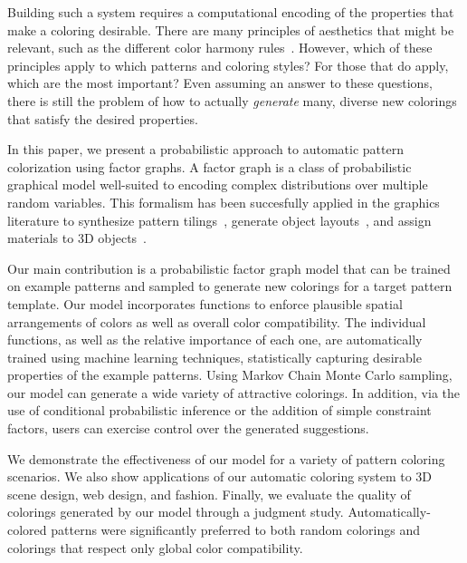 Building such a system requires a computational encoding of the properties that make a coloring desirable. There are many principles of aesthetics that might be relevant, such as the different color harmony rules~\cite{ColorHarmonyBook}. However, which of these principles apply to which patterns and coloring styles? For those that do apply, which are the most important? Even assuming an answer to these questions, there is still the problem of how to actually \emph{generate} many, diverse new colorings that satisfy the desired properties.

In this paper, we present a probabilistic approach to automatic pattern colorization using factor graphs. A factor graph is a class of probabilistic graphical model well-suited to encoding complex distributions over multiple random variables. This formalism has been succesfully applied in the graphics literature to synthesize pattern tilings~\cite{YiTingTiledPatterns}, generate object layouts~\cite{YiTingLARJ}, and assign materials to 3D objects~\cite{MaterialMemex}.

Our main contribution is a probabilistic factor graph model that can be trained on example patterns and sampled to generate new colorings for a target pattern template. Our model incorporates functions to enforce plausible spatial arrangements of colors as well as overall color compatibility. The individual functions, as well as the relative importance of each one, are automatically trained using machine learning techniques, statistically capturing desirable properties of the example patterns. Using Markov Chain Monte Carlo sampling, our model can generate a wide variety of attractive colorings. In addition, via the use of conditional probabilistic inference or the addition of simple constraint factors, users can exercise control over the generated suggestions.

We demonstrate the effectiveness of our model for a variety of pattern coloring scenarios. We also show applications of our automatic coloring system to 3D scene design, web design, and fashion. Finally, we evaluate the quality of colorings generated by our model through a judgment study. Automatically-colored patterns were significantly preferred to both random colorings and colorings that respect only global color compatibility.